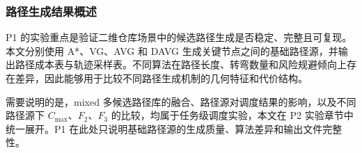 \subsubsection{路径生成结果概述}

P1 的实验重点是验证二维仓库场景中的候选路径生成是否稳定、完整且可复现。本文分别使用 A*、VG、AVG 和 DAVG 生成关键节点之间的基础路径源，并输出路径成本表与轨迹采样表。不同算法在路径长度、转弯数量和风险规避倾向上存在差异，因此能够用于比较不同路径生成机制的几何特征和代价结构。

需要说明的是，mixed 多候选路径库的融合、路径源对调度结果的影响，以及不同路径源下 $C_{\max}$、$F_2$、$F_3$ 的比较，均属于任务级调度实验，本文在 P2 实验章节中统一展开。P1 在此处只说明基础路径源的生成质量、算法差异和输出文件完整性。
